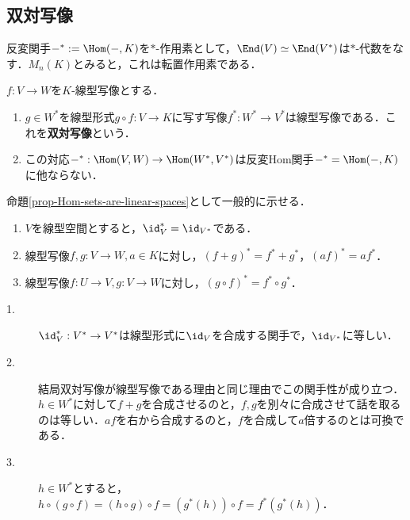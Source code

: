 \documentclass[uplatex, dvipdfmx]{jsreport}
\begin{document}
\subsection{双対写像}

\begin{tcolorbox}[colframe=ForestGreen, colback=ForestGreen!10!white,breakable,colbacktitle=ForestGreen!40!white,coltitle=black,fonttitle=\bfseries\sffamily,
title=]
    反変関手$-^*:=\Hom(-,K)$を$*$-作用素として，$\End(V)\simeq\End(V^*)$は$*$-代数をなす．$M_n(K)$とみると，これは転置作用素である．
\end{tcolorbox}

\begin{proposition}
    $f:V\to W$を$K$-線型写像とする．
    \begin{enumerate}
        \item $g\in W^*$を線型形式$g\circ f:V\to K$に写す写像$f^*:W^*\to V^*$は線型写像である．これを\textbf{双対写像}という．
        \item この対応$-^*:\Hom(V,W)\to\Hom(W^*,V^*)$は反変Hom関手$-^*=\Hom(-,K)$に他ならない．
    \end{enumerate}
\end{proposition}
\begin{Proof}
    命題\ref{prop-Hom-sets-are-linear-spaces}として一般的に示せる．
\end{Proof}

\begin{proposition}\mbox{}\label{prop-Hom-K-is-contravariant}
    \begin{enumerate}
        \item $V$を線型空間とすると，$\id^*_V=\id_{V^*}$である．
        \item 線型写像$f,g:V\to W,a\in K$に対し，$(f+g)^*=f^*+g^*$，$(af)^*=af^*$．
        \item 線型写像$f:U\to V,g:V\to W$に対し，$(g\circ f)^*=f^*\circ g^*$．
    \end{enumerate}
\end{proposition}
\begin{Proof}\mbox{}
    \begin{description}
        \item[1.] $\id^*_V:V^*\to V^*$は線型形式に$\id_V$を合成する関手で，$\id_{V^*}$に等しい．
        \item[2.] 結局双対写像が線型写像である理由と同じ理由でこの関手性が成り立つ．$h\in W^*$に対して$f+g$を合成させるのと，$f,g$を別々に合成させて話を取るのは等しい．$af$を右から合成するのと，$f$を合成して$a$倍するのとは可換である．
        \item[3.] $h\in W^*$とすると，$h\circ(g\circ f)=(h\circ g)\circ f=(g^*(h))\circ f=f^*(g^*(h))$．
    \end{description}
\end{Proof}
\end{document}
